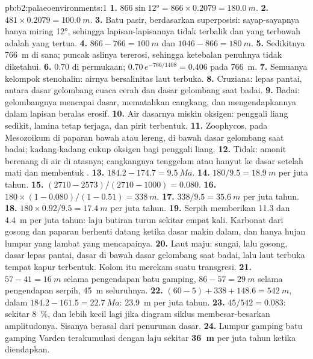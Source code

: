 \begin{solution}{pb:b2:palaeoenvironments:1}
\textbf{1.} $866 \sin \ang{12} = 866 \times 0.2079 = \qty{180.0}{m}$.
\textbf{2.} $481 \times 0.2079 = \qty{100.0}{m}$.
\textbf{3.} Batu pasir, berdasarkan superposisi: sayap-sayapnya hanya miring \ang{12}, sehingga lapisan-lapisannya tidak
terbalik dan yang terbawah adalah yang tertua.
\textbf{4.} $866 - 766 = \qty{100}{m}$ dan $1046 - 866 = \qty{180}{m}$.
\textbf{5.} Sedikitnya \qty{766}{m} di sana; puncak aslinya tererosi, sehingga ketebalan penuhnya
tidak diketahui.
\textbf{6.} 0.70 di permukaan; $0.70\,e^{-766/1408} = 0.406$ pada \qty{766}{m}.
\textbf{7.} Semuanya kelompok stenohalin: airnya bersalinitas laut terbuka.
\textbf{8.}  Cruziana: lepas pantai, antara dasar gelombang cuaca cerah dan dasar gelombang
saat badai.
\textbf{9.} Badai: gelombangnya mencapai dasar, mematahkan cangkang, dan mengendapkannya dalam lapisan
beralas erosif.
\textbf{10.} Air dasarnya miskin oksigen: penggali liang sedikit, lamina tetap terjaga, dan pirit terbentuk.
\textbf{11.}  Zoophycos, pada Mesozoikum di paparan bawah atau lereng, di bawah
dasar gelombang saat badai; kadang-kadang cukup oksigen bagi penggali liang.
\textbf{12.} Tidak: amonit berenang di air di atasnya; cangkangnya tenggelam atau hanyut ke dasar
setelah mati dan membentuk .
\textbf{13.} $184.2 - 174.7 = \qty{9.5}{Ma}$.
\textbf{14.} $180/9.5 = \qty{18.9}{m}$ per juta tahun.
\textbf{15.} $(2710 - 2573)/(2710 - 1000) = 0.080$.
\textbf{16.} $180 \times (1 - 0.080)/(1 - 0.51) = \qty{338}{m}$.
\textbf{17.} $338/9.5 = \qty{35.6}{m}$ per juta tahun.
\textbf{18.} $180 \times 0.92/9.5 = \qty{17.4}{m}$ per juta tahun.
\textbf{19.} Serpih memberikan 11.3 dan \qty{4.4}{m} per juta tahun: laju butiran turun
sekitar empat kali. Karbonat dari gosong dan paparan berhenti datang ketika dasar
makin dalam, dan hanya hujan lumpur yang lambat yang mencapainya.
\textbf{20.} Laut maju: sungai, lalu gosong, dasar lepas pantai, dasar di bawah dasar gelombang saat
badai, lalu laut terbuka tempat kapur terbentuk. Kolom itu merekam suatu transgresi.
\textbf{21.} $57 - 41 = \qty{16}{m}$ selama pengendapan batu gamping, $86 - 57 = \qty{29}{m}$ selama pengendapan serpih,
\qty{45}{m} seluruhnya.
\textbf{22.} $(60 - 5) + 338 + 148.6 = \qty{542}{m}$, dalam $184.2 - 161.5 = \qty{22.7}{Ma}$:
\qty{23.9}{m} per juta tahun.
\textbf{23.} $45/542 = 0.083$: sekitar \qty{8}{\percent}, dan lebih kecil lagi jika diagram siklus membesar-besarkan
amplitudonya. Sisanya berasal dari penurunan dasar.
\textbf{24.} Lumpur gamping batu gamping Varden terakumulasi dengan laju sekitar
\textbf{\qty[text-series-to-math=true]{36}{m}} per juta tahun ketika diendapkan.
\end{solution}
